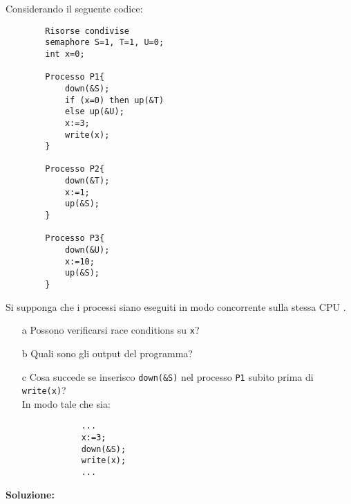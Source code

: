\documentclass{article}
\begin{document}
    Considerando il seguente codice:
    \begin{lstlisting}
        Risorse condivise
        semaphore S=1, T=1, U=0;
        int x=0;

        Processo P1{
            down(&S);
            if (x=0) then up(&T)
            else up(&U);
            x:=3;
            write(x);
        }

        Processo P2{
            down(&T);
            x:=1;
            up(&S);
        }

        Processo P3{
            down(&U);
            x:=10;
            up(&S);
        }
    \end{lstlisting}
    Si supponga che i processi siano eseguiti in modo concorrente sulla stessa CPU .\\
    \begin{enumerate}
        \item[a] Possono verificarsi race conditions su \verb+x+?
        \item[b] Quali sono gli output del programma?
        \item[c] Cosa succede se inserisco \verb+down(&S)+ nel processo \verb+P1+ subito prima  di \verb+write(x)+?\\
        In modo tale che sia:
        \begin{lstlisting}
            ...
            x:=3;
            down(&S);
            write(x);
            ...
        \end{lstlisting}
    \end{enumerate}
    \textbf{Soluzione:}
\end{document}
